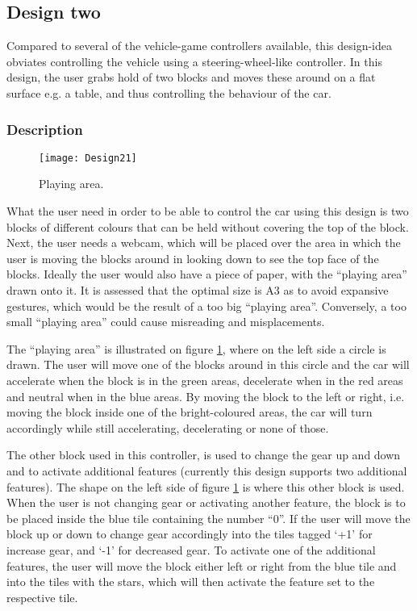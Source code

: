 \subsection{Design two}
\label{design2}
Compared to several of the vehicle-game controllers available, this design-idea obviates controlling the vehicle using a steering-wheel-like controller. In this design, the user grabs hold of two blocks and moves these around on a flat surface e.g. a table, and thus controlling the behaviour of the car.

\subsubsection*{Description}

\begin{figure}[!htbp]
\centering
\texttt{[image: Design21]}
\caption{Playing area.}
\label{fig:design21}
\end{figure}

What the user need in order to be able to control the car using this design is two blocks of different colours that can be held without covering the top of the block. Next, the user needs a webcam, which will be placed over the area in which the user is moving the blocks around in looking down to see the top face of the blocks. Ideally the user would also have a piece of paper, with the “playing area” drawn onto it. It is assessed that the optimal size is A3 as to avoid expansive gestures, which would be the result of a too big “playing area”. Conversely, a too small “playing area” could cause misreading and misplacements.
\bigskip

The “playing area” is illustrated on figure \ref{fig:design21}, where on the left side a circle is drawn. The user will move one of the blocks around in this circle and the car will accelerate when the block is in the green areas, decelerate when in the red areas and neutral when in the blue areas. By moving the block to the left or right, i.e. moving the block inside one of the bright-coloured areas, the car will turn accordingly while still accelerating, decelerating or none of those.

The other block used in this controller, is used to change the gear up and down and to activate additional features (currently this design supports two additional features). The shape on the left side of figure \ref{fig:design21} is where this other block is used. When the user is not changing gear or activating another feature, the block is to be placed inside the blue tile containing the number “0”. If the user will move the block up or down to change gear accordingly into the tiles tagged ‘+1’ for increase gear, and ‘-1’ for decreased gear. To activate one of the additional features, the user will move the block either left or right from the blue tile and into the tiles with the stars, which will then activate the feature set to the respective tile.

